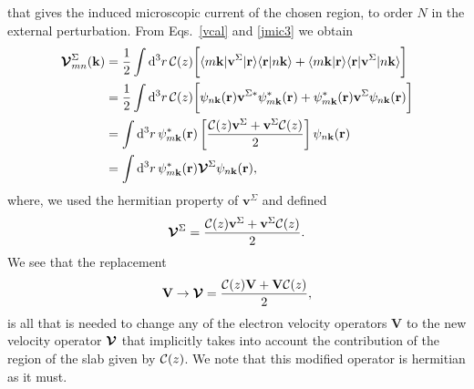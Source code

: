 \documentclass[floatfix,prb,aps,superscriptaddress,showpacs,letterpaper]{revtex4}
\begin{document}
that gives the induced microscopic current of the chosen region, to order $N$ 
in the external perturbation. 
From
Eqs.~\eqref{vcal} and \eqref{jmic3} we obtain
\begin{align*}
{\boldsymbol{\mathcal{V}}}^{\Sigma}_{mn}({\mathbf k})
&=
\frac{1}{2}
\int \mathrm{d}^3 r\,
 {\mathbf{\cal C}}(z)
\bigg[
\langle m\mathbf{k}|\mathbf{v}^\Sigma | \mathbf{r}\rangle
\langle \mathbf{r} | n \mathbf k \rangle +
\langle m\mathbf{k} | \mathbf{r}\rangle
\langle \mathbf{r} | \mathbf{v}^\Sigma | n \mathbf k \rangle\bigg]
\nonumber\\
&=
\frac{1}{2}
\int \mathrm{d}^3 r\,
 {\mathbf{\cal C}}(z)
 \bigg[
\psi_{n\mathbf{k}}(\mathbf{r})
\mathbf{v}^{\Sigma *}\psi^*_{m\mathbf{k}}(\mathbf{r})
+ 
\psi^*_{m\mathbf{k}}(\mathbf{r})\mathbf{v}^\Sigma
\psi_{n\mathbf{k}}(\mathbf{r})
\bigg]
\nonumber\\
&=
\int \mathrm{d}^3 r\,
\psi^*_{m\mathbf{k}}(\mathbf{r})
\left[\frac{{\mathbf{\cal C}}(z) \mathbf{v}^\Sigma +
\mathbf{v}^\Sigma {\mathbf{\cal C}}(z)}{2}\right]
\psi_{n\mathbf{k}}(\mathbf{r})
\nonumber\\
&=
\int \mathrm{d}^3 r\,
\psi^*_{m\mathbf{k}}(\mathbf{r})
\boldsymbol{\mathcal{\cal V}}^{\Sigma}
\psi_{n\mathbf{k}}(\mathbf{r})
,
\end{align*}
where, we used the hermitian property of $\mathbf{v}^\Sigma$ and defined
\begin{equation*}
\boldsymbol{\mathcal{\cal V}}^{\Sigma}
=
\frac{{\mathbf{\cal C}}(z) \mathbf{v}^\Sigma +
\mathbf{v}^\Sigma {\mathbf{\cal C}}(z)}{2}
.
\end{equation*} 
We see that the replacement
\begin{equation}
\mathbf{V} \to \boldsymbol{\mathcal{\cal V}}=\frac{{\mathbf{\cal C}}(z) \mathbf{V} +
\mathbf{V} {\mathbf{\cal C}}(z)}{2}
,
\label{vcali}
\end{equation} 
is all that is needed to change any of the
electron velocity operators $\mathbf{V}$ to the new velocity
operator $\boldsymbol{\mathcal{\cal V}}$ that implicitly takes into account the
contribution of the region of the slab given by ${\mathbf{\cal C}}(z)$.
We note that this modified operator is hermitian as it must.\cite{note2}
\end{document}
